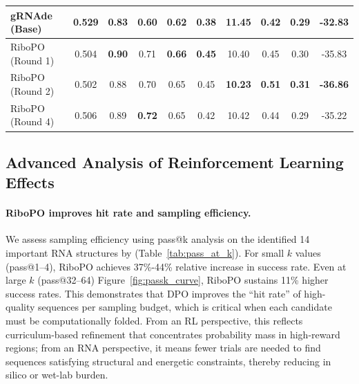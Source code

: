 \begin{table}[ht!]
{\begin{tabular}{lccccccccc}
gRNAde (Base) & 0.529 & 0.83 & 0.60 & 0.62 & 0.38 & 11.45 & 0.42 & 0.29 & -32.83 \\
\midrule
RiboPO (Round 1) & 0.504 & \textbf{0.90} & 0.71 & \textbf{0.66} & \textbf{0.45} & 10.40 & 0.45 & 0.30 & -35.83 \\
RiboPO (Round 2) & 0.502 & 0.88 & 0.70 & 0.65 & 0.45 & \textbf{10.23} & \textbf{0.51} & \textbf{0.31} &  \textbf{-36.86} \\
RiboPO (Round 4) &  0.506 &  0.89 &  \textbf{0.72} & 0.65 & 0.42 & 10.42 & 0.44 & 0.29 &  -35.22 \\   
\bottomrule
\end{tabular}%
}
\raggedright

\end{table}



\subsection{Advanced Analysis of Reinforcement Learning Effects}

\paragraph{RiboPO improves hit rate and sampling efficiency.}
We assess sampling efficiency using pass@k analysis on the identified 14 important RNA structures by \citep{das2010farfar} (Table~\ref{tab:pass_at_k}). For small $k$ values (pass@1–4), RiboPO achieves 37\%-44\% relative increase in success rate. Even at large $k$ (pass@32–64) Figure~\ref{fig:passk_curve}, RiboPO sustains 11\% higher success rates. This demonstrates that DPO improves the “hit rate” of high-quality sequences per sampling budget, which is critical when each candidate must be computationally folded. From an RL perspective, this reflects curriculum-based refinement that concentrates probability mass in high-reward regions; from an RNA perspective, it means fewer trials are needed to find sequences satisfying structural and energetic constraints, thereby reducing in silico or wet-lab burden.




